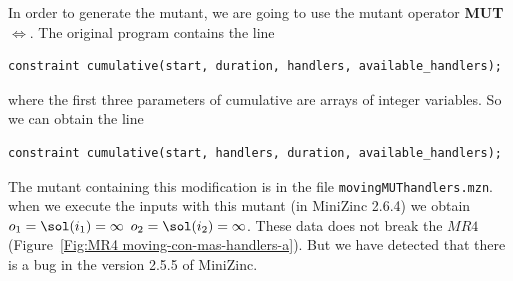In order to generate the mutant, we are going to use
the mutant operator \textbf{MUT\(\Leftrightarrow\)}.
The original program contains the line
\begin{lstlisting}
constraint cumulative(start, duration, handlers, available_handlers);
\end{lstlisting}
where the first three parameters of cumulative are arrays of integer
variables. So we can obtain the line
\begin{lstlisting}
constraint cumulative(start, handlers, duration, available_handlers);
\end{lstlisting}
The mutant containing this modification is in the file
\lstinline{movingMUThandlers.mzn}.
when we execute the inputs with this mutant (in MiniZinc 2.6.4) we obtain  $o_{1}=\sol(i_{1})=\infty$
$o_{2}=\sol(i_{2})=\infty$. These data does not break the $MR4$
(Figure~\ref{Fig:MR4 moving-con-mas-handlers-a}).
But we have detected that there is a bug in the version 2.5.5 of MiniZinc.



